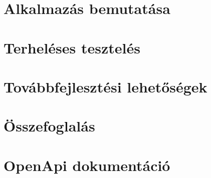 \chapter{Alkalmazás bemutatása}\label{ch:bemutatas}
\pagestyle{main}



\chapter{Terheléses tesztelés}
\pagestyle{main}



\chapter{Továbbfejlesztési lehetőségek}
\pagestyle{main}



\chapter*{Összefoglalás}\label{ch:osszefoglalas}
\pagestyle{plain}


\newpage






\appendix
\chapter{OpenApi dokumentáció}\label{appendix:openapi}




